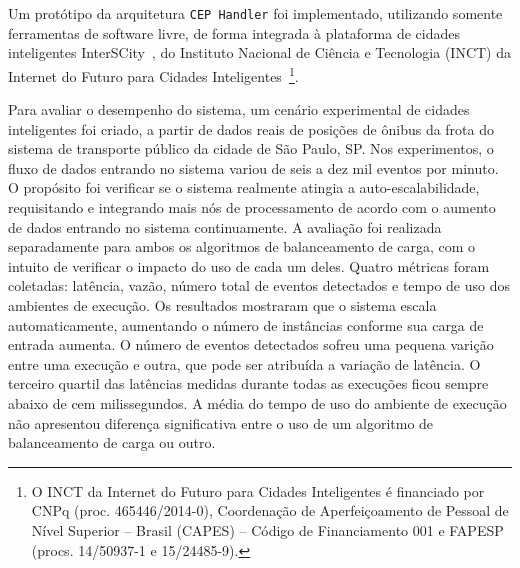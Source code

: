 Um protótipo da arquitetura \texttt{CEP Handler} foi implementado, utilizando somente ferramentas de software livre, de forma integrada à plataforma de cidades inteligentes InterSCity~\citep{del2019design}, do Instituto Nacional de Ciência e Tecnologia (INCT) da Internet do Futuro para Cidades Inteligentes~\citep{Interscitysite}\footnote{O INCT da Internet do Futuro para Cidades Inteligentes é financiado por CNPq (proc. 465446/2014-0), Coordenação de Aperfeiçoamento de Pessoal de Nível Superior – Brasil (CAPES) – Código de Financiamento 001 e FAPESP (procs. 14/50937-1 e 15/24485-9).}. 



Para avaliar o desempenho do sistema, um cenário experimental de cidades inteligentes foi criado, a partir de dados reais de posições de ônibus da frota do sistema de transporte público da cidade de São Paulo, SP.
Nos experimentos, o fluxo de dados entrando no sistema variou de seis a dez mil eventos por minuto. O propósito foi verificar se o sistema realmente atingia a auto-escalabilidade, requisitando e integrando mais nós de processamento de acordo com o aumento de dados entrando no sistema continuamente. A avaliação foi realizada separadamente para ambos os algoritmos de balanceamento de carga, com o intuito de verificar o impacto do uso de cada um deles. Quatro métricas foram coletadas: latência, vazão, número total de eventos detectados e tempo de uso dos ambientes de execução. Os resultados mostraram que o sistema escala automaticamente, aumentando o número de instâncias conforme sua carga de entrada aumenta. O número de eventos detectados sofreu uma pequena varição entre uma execução e outra, que pode ser atribuída a variação de latência. O terceiro quartil das latências medidas durante todas as execuções ficou sempre abaixo de cem milissegundos. A média do tempo de uso do ambiente de execução não apresentou diferença significativa entre o uso de um algoritmo de balanceamento de carga ou outro.





